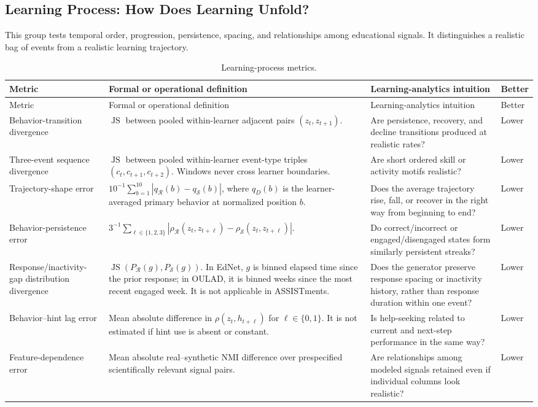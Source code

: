 \documentclass[10pt]{article}
\newcommand{\R}{\mathcal{R}}
\newcommand{\SYN}{\mathcal{S}}
\newcommand{\JS}{\operatorname{JS}}
\begin{document}
\subsection{Learning Process: How Does Learning Unfold?}

This group tests temporal order, progression, persistence, spacing, and
relationships among educational signals.  It distinguishes a realistic bag
of events from a realistic learning trajectory.

\begin{longtable}{@{}p{3.5cm}p{6.1cm}p{5.2cm}p{1.4cm}@{}}
\caption{Learning-process metrics.}\label{tab:supp-dictionary-process}\\
\toprule
Metric & Formal or operational definition & Learning-analytics intuition & Better \\
\midrule
\endfirsthead
\toprule
Metric & Formal or operational definition & Learning-analytics intuition & Better \\
\midrule
\endhead
\bottomrule
\endlastfoot
Behavior-transition divergence & \(\JS\) between pooled within-learner adjacent pairs \((z_t,z_{t+1})\). & Are persistence, recovery, and decline transitions produced at realistic rates? & Lower \\
Three-event sequence divergence & \(\JS\) between pooled within-learner event-type triples \((c_t,c_{t+1},c_{t+2})\).  Windows never cross learner boundaries. & Are short ordered skill or activity motifs realistic? & Lower \\
Trajectory-shape error & \(10^{-1}\sum_{b=1}^{10}|q_{\R}(b)-q_{\SYN}(b)|\), where \(q_D(b)\) is the learner-averaged primary behavior at normalized position \(b\). & Does the average trajectory rise, fall, or recover in the right way from beginning to end? & Lower \\
Behavior-persistence error & \(3^{-1}\sum_{\ell\in\{1,2,3\}}|\rho_{\R}(z_t,z_{t+\ell})-\rho_{\SYN}(z_t,z_{t+\ell})|\). & Do correct/incorrect or engaged/disengaged states form similarly persistent streaks? & Lower \\
Response/inactivity-gap distribution divergence & \(\JS(P_{\R}(g),P_{\SYN}(g))\). In EdNet, \(g\) is binned elapsed time since the prior response; in OULAD, it is binned weeks since the most recent engaged week. It is not applicable in ASSISTments. & Does the generator preserve response spacing or inactivity history, rather than response duration within one event? & Lower \\
Behavior--hint lag error & Mean absolute difference in \(\rho(z_t,h_{t+\ell})\) for \(\ell\in\{0,1\}\).  It is not estimated if hint use is absent or constant. & Is help-seeking related to current and next-step performance in the same way? & Lower \\
Feature-dependence error & Mean absolute real--synthetic NMI difference over prespecified scientifically relevant signal pairs. & Are relationships among modeled signals retained even if individual columns look realistic? & Lower \\
\end{longtable}
\end{document}
